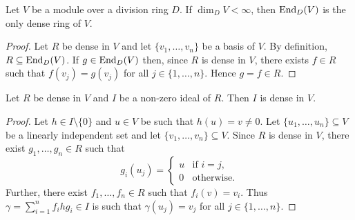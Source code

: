 %
%

\begin{proposition}
	\label{pro:unique_dense}
	Let $V$ be a module over a division ring $D$. 
	If $\dim_DV<\infty$, then $\operatorname{End}_D(V)$ is the only dense ring of $V$.
\end{proposition}

\begin{proof}
	Let $R$ be dense in $V$ and let $\{v_1,\dots,v_n\}$ be a basis of $V$. By definition,
	$R\subseteq\operatorname{End}_D(V)$. If $g\in\operatorname{End}_D(V)$ then, since $R$ is dense in $V$, there
	exists $f\in R$ such that $f(v_j)=g(v_j)$ for all 
	$j\in\{1,\dots,n\}$. Hence $g=f\in R$.
\end{proof}

\begin{lemma}
	\label{lem:ideal_denso}
	Let $R$ be dense in $V$ and $I$ be a non-zero ideal of $R$. Then 
	$I$ is dense in $V$. 
\end{lemma}

\begin{proof}
	Let $h\in I\setminus\{0\}$ and $u\in V$ be such that 
	$h(u)=v\ne0$. Let $\{u_1,\dots,u_n\}\subseteq V$ be a linearly independent set 
	and let $\{v_1,\dots,v_n\}\subseteq V$. Since $R$ is 
	dense in $V$, there exist $g_1,\dots,g_n\in R$ such that 
	\[
	g_i(u_j)=\begin{cases} 
	u & \text{if $i=j$},\\
	0 & \text{otherwise}.
	\end{cases}
	\]
	Further, there exist $f_1,\dots,f_n\in R$ such that 
	$f_i(v)=v_i$. Thus $\gamma=\sum_{i=1}^n f_ihg_i\in I$ is such that 
	$\gamma(u_j)=v_j$ for all $j\in\{1,\dots,n\}$.
\end{proof}

